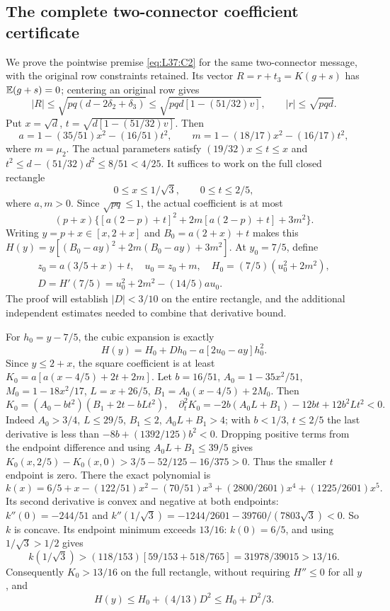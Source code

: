 \subsection{The complete two-connector coefficient certificate}\label{proof:Q5-C037-coefficient}
We prove the pointwise premise \eqref{eq:L37:C2} for the same
two-connector message, with the original row constraints retained.
Its vector $R=r+t_3=K(g+s)$ has $\mathbb E(g+s)=0$; centering an original
row gives
\[
|R|\le\sqrt{pq(d-2\delta_2+\delta_3)}
\le\sqrt{pqd[1-(51/32)v]},\qquad |r|\le\sqrt{pqd}.
\]
Put $x=\sqrt d$, $t=\sqrt{d[1-(51/32)v]}$. Then
\[
a=1-(35/51)x^2-(16/51)t^2,\qquad
m=1-(18/17)x^2-(16/17)t^2,
\]
where $m=\mu_2$. The actual parameters satisfy $(19/32)x\le t\le x$
and $t^2\le d-(51/32)d^2\le8/51<4/25$.
It suffices to work on the full closed rectangle
\begin{equation}\tag{L37.8.3}\label{eq:L37:rectangle}
0\le x\le1/\sqrt3,\qquad0\le t\le2/5,
\end{equation}
where $a,m>0$. Since $\sqrt{pq}\le1$, the actual coefficient is at most
\[
(p+x)\{[a(2-p)+t]^2+2m[a(2-p)+t]+3m^2\}.
\]
Writing $y=p+x\in[x,2+x]$ and $B_0=a(2+x)+t$ makes this
$H(y)=y[(B_0-ay)^2+2m(B_0-ay)+3m^2]$.
At $y_0=7/5$, define
\[
\begin{gathered}
z_0=a(3/5+x)+t,\quad u_0=z_0+m,\quad H_0=(7/5)(u_0^2+2m^2),\\
D=H'(7/5)=u_0^2+2m^2-(14/5)au_0.
\end{gathered}
\]
The proof will establish $|D|<3/10$ on the entire rectangle, and the
additional independent estimates needed to combine that derivative bound.

For $h_0=y-7/5$, the cubic expansion is exactly
\[
H(y)=H_0+Dh_0-a[2u_0-ay]h_0^2.
\]
Since $y\le2+x$, the square coefficient is at least
$K_0=a[a(x-4/5)+2t+2m]$.
Let $b=16/51$, $A_0=1-35x^2/51$, $M_0=1-18x^2/17$,
$L=x+26/5$, $B_1=A_0(x-4/5)+2M_0$. Then
\[
K_0=(A_0-bt^2)(B_1+2t-bLt^2),\quad
\partial_t^2K_0=-2b(A_0L+B_1)-12bt+12b^2Lt^2<0.
\]
Indeed $A_0>3/4$, $L\le29/5$, $B_1\le2$, $A_0L+B_1>4$;
with $b<1/3$, $t\le2/5$ the last derivative is less than
$-8b+(1392/125)b^2<0$.
Dropping positive terms from the endpoint difference and using
$A_0L+B_1\le39/5$ gives
$K_0(x,\allowbreak 2/5)-K_0(x,\allowbreak 0)>3/5-52/125-16/375>0$.
Thus the smaller $t$ endpoint is zero. There the exact polynomial is
\[
k(x)=6/5+x-(122/51)x^2-(70/51)x^3
+(2800/2601)x^4+(1225/2601)x^5.
\]
Its second derivative is convex and negative at both endpoints:
$k''(0)=-244/51$ and
$k''(1/\sqrt3)=-1244/2601-39760/(7803\sqrt3)<0$.
So $k$ is concave. Its endpoint minimum exceeds $13/16$:
$k(0)=6/5$, and using $1/\sqrt3>1/2$ gives
\[
k(1/\sqrt3)>(118/153)[59/153+518/765]=31978/39015>13/16.
\]
Consequently $K_0>13/16$ on the full rectangle, without requiring
$H''\le0$ for all $y$, and
\begin{equation}\tag{L37.8.6}\label{eq:L37:Taylor}
H(y)\le H_0+(4/13)D^2\le H_0+D^2/3.
\end{equation}

